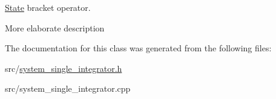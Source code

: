 \hyperlink{class_single_integrator_1_1_state}{State} bracket operator. 

More elaborate description 

The documentation for this class was generated from the following files\-:\begin{DoxyCompactItemize}
\item 
src/\hyperlink{system__single__integrator_8h}{system\-\_\-single\-\_\-integrator.\-h}\item 
src/system\-\_\-single\-\_\-integrator.\-cpp\end{DoxyCompactItemize}
